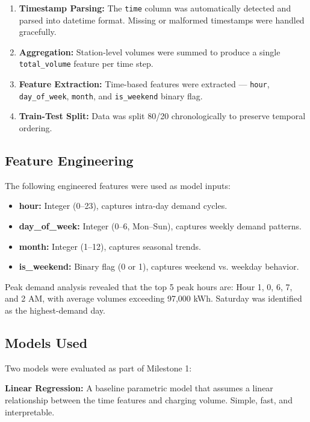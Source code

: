 \documentclass[conference]{IEEEtran}
\begin{document}
\begin{enumerate}
    \item \textbf{Timestamp Parsing:} The \texttt{time} column was automatically detected and parsed into datetime format. Missing or malformed timestamps were handled gracefully.
    \item \textbf{Aggregation:} Station-level volumes were summed to produce a single \texttt{total\_volume} feature per time step.
    \item \textbf{Feature Extraction:} Time-based features were extracted — \texttt{hour}, \texttt{day\_of\_week}, \texttt{month}, and \texttt{is\_weekend} binary flag.
    \item \textbf{Train-Test Split:} Data was split 80/20 chronologically to preserve temporal ordering.
\end{enumerate}

\subsection{Feature Engineering}

The following engineered features were used as model inputs:

\begin{itemize}
    \item \textbf{hour:} Integer (0–23), captures intra-day demand cycles.
    \item \textbf{day\_of\_week:} Integer (0–6, Mon–Sun), captures weekly demand patterns.
    \item \textbf{month:} Integer (1–12), captures seasonal trends.
    \item \textbf{is\_weekend:} Binary flag (0 or 1), captures weekend vs. weekday behavior.
\end{itemize}

Peak demand analysis revealed that the top 5 peak hours are: Hour 1, 0, 6, 7, and 2 AM, with average volumes exceeding 97,000 kWh. Saturday was identified as the highest-demand day.

\subsection{Models Used}

Two models were evaluated as part of Milestone 1:

\textbf{Linear Regression:} A baseline parametric model that assumes a linear relationship between the time features and charging volume. Simple, fast, and interpretable.
\end{document}
